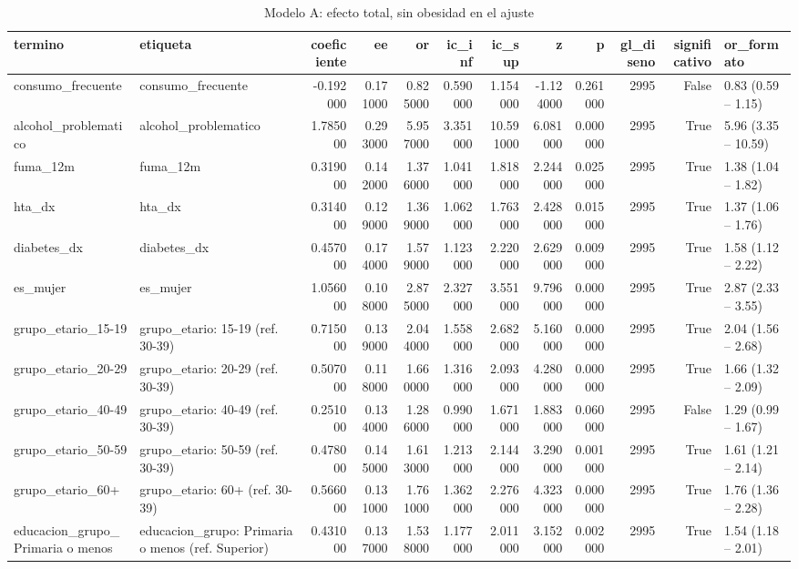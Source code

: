 \begin{table}[htbp]
\caption{Modelo A: efecto total, sin obesidad en el ajuste}
\label{tab:tabla_44_modelo_A_efecto_total}
\begin{tabular}{llrrrrrrrrrl}
\toprule
termino & etiqueta & coeficiente & ee & or & ic\_inf & ic\_sup & z & p & gl\_diseno & significativo & or\_formato \\
\midrule
consumo\_frecuente & consumo\_frecuente & -0.192000 & 0.171000 & 0.825000 & 0.590000 & 1.154000 & -1.124000 & 0.261000 & 2995 & False & 0.83 (0.59 – 1.15) \\
alcohol\_problematico & alcohol\_problematico & 1.785000 & 0.293000 & 5.957000 & 3.351000 & 10.591000 & 6.081000 & 0.000000 & 2995 & True & 5.96 (3.35 – 10.59) \\
fuma\_12m & fuma\_12m & 0.319000 & 0.142000 & 1.376000 & 1.041000 & 1.818000 & 2.244000 & 0.025000 & 2995 & True & 1.38 (1.04 – 1.82) \\
hta\_dx & hta\_dx & 0.314000 & 0.129000 & 1.369000 & 1.062000 & 1.763000 & 2.428000 & 0.015000 & 2995 & True & 1.37 (1.06 – 1.76) \\
diabetes\_dx & diabetes\_dx & 0.457000 & 0.174000 & 1.579000 & 1.123000 & 2.220000 & 2.629000 & 0.009000 & 2995 & True & 1.58 (1.12 – 2.22) \\
es\_mujer & es\_mujer & 1.056000 & 0.108000 & 2.875000 & 2.327000 & 3.551000 & 9.796000 & 0.000000 & 2995 & True & 2.87 (2.33 – 3.55) \\
grupo\_etario\_15-19 & grupo\_etario: 15-19 (ref. 30-39) & 0.715000 & 0.139000 & 2.044000 & 1.558000 & 2.682000 & 5.160000 & 0.000000 & 2995 & True & 2.04 (1.56 – 2.68) \\
grupo\_etario\_20-29 & grupo\_etario: 20-29 (ref. 30-39) & 0.507000 & 0.118000 & 1.660000 & 1.316000 & 2.093000 & 4.280000 & 0.000000 & 2995 & True & 1.66 (1.32 – 2.09) \\
grupo\_etario\_40-49 & grupo\_etario: 40-49 (ref. 30-39) & 0.251000 & 0.134000 & 1.286000 & 0.990000 & 1.671000 & 1.883000 & 0.060000 & 2995 & False & 1.29 (0.99 – 1.67) \\
grupo\_etario\_50-59 & grupo\_etario: 50-59 (ref. 30-39) & 0.478000 & 0.145000 & 1.613000 & 1.213000 & 2.144000 & 3.290000 & 0.001000 & 2995 & True & 1.61 (1.21 – 2.14) \\
grupo\_etario\_60+ & grupo\_etario: 60+ (ref. 30-39) & 0.566000 & 0.131000 & 1.761000 & 1.362000 & 2.276000 & 4.323000 & 0.000000 & 2995 & True & 1.76 (1.36 – 2.28) \\
educacion\_grupo\_Primaria o menos & educacion\_grupo: Primaria o menos (ref. Superior) & 0.431000 & 0.137000 & 1.538000 & 1.177000 & 2.011000 & 3.152000 & 0.002000 & 2995 & True & 1.54 (1.18 – 2.01) \\

\end{tabular}
\end{table}
